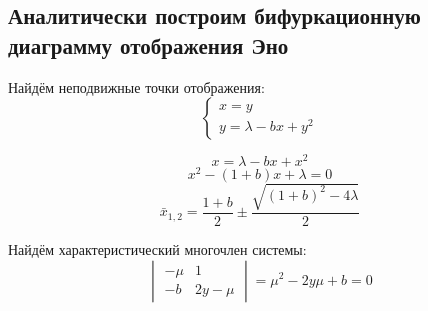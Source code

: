 \documentclass[12pt, a4paper]{article}
\begin{document}
\subsection{Аналитически построим бифуркационную диаграмму отображения Эно}
Найдём неподвижные точки отображения:
\begin{equation*}
	\begin{cases}
		x = y \\
		y = \lambda - bx + y^2
	\end{cases}
\end{equation*}

\[ x = \lambda - bx + x^2 \]
\[ x^2 - (1 + b)x + \lambda = 0 \]
\[ \bar x_{1,2} = \frac{1 + b}{2} \pm \frac{\sqrt{(1 + b)^2 - 4\lambda}}{2} \]

Найдём характеристический многочлен системы:
\begin{equation*}
	\begin{vmatrix}
		-\mu & 1 \\
		-b & 2y  - \mu
	\end{vmatrix}
	= \mu^2 - 2y\mu + b = 0
\end{equation*}
\end{document}
